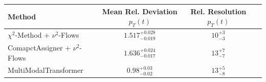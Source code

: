     \begin{tabular}{lccc}
        \toprule
        Method & Mean Rel. Deviation $p_{T}(t)$ & Rel. Resolution $p_{T}(t)$ \\
        \midrule
        $\chi^2$-Method + $\nu^2$-Flows & $1.517^{+0.028}_{-0.019}$ & $10^{+3}_{-3}$ \\
        ComapctAssigner + $\nu^2$-Flows & $1.636^{+0.024}_{-0.017}$ & $13^{+7}_{-7}$ \\
        MultiModalTransformer & $0.98^{+0.03}_{-0.02}$ & $13^{+5}_{-8}$ \\
        \bottomrule
    \end{tabular}